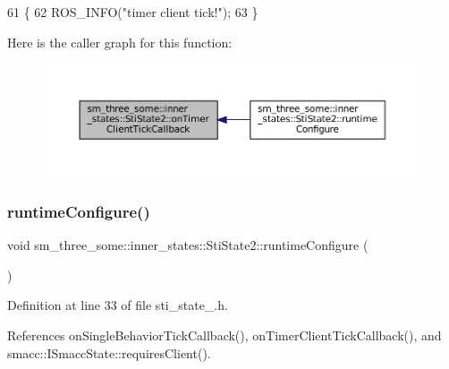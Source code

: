 \begin{DoxyCode}
61   \{
62     ROS\_INFO(\textcolor{stringliteral}{"timer client tick!"});
63   \}
\end{DoxyCode}
Here is the caller graph for this function\+:
\nopagebreak
\begin{figure}[H]
\begin{center}
\leavevmode
\includegraphics[width=350pt]{structsm__three__some_1_1inner__states_1_1StiState2_a59008027e276123e39a8908116ea8ab9_icgraph}
\end{center}
\end{figure}
\mbox{\label{structsm__three__some_1_1inner__states_1_1StiState2_a46bf7c838fb2cbf92e5b17b17165af41}} 
\subsubsection{\texorpdfstring{runtime\+Configure()}{runtimeConfigure()}}
{\footnotesize\ttfamily void sm\+\_\+three\+\_\+some\+::inner\+\_\+states\+::\+Sti\+State2\+::runtime\+Configure (\begin{DoxyParamCaption}{ }\end{DoxyParamCaption})\hspace{0.3cm}{\ttfamily [inline]}}



Definition at line 33 of file sti\+\_\+state\+\_.\+h.



References on\+Single\+Behavior\+Tick\+Callback(), on\+Timer\+Client\+Tick\+Callback(), and smacc\+::\+I\+Smacc\+State\+::requires\+Client().


